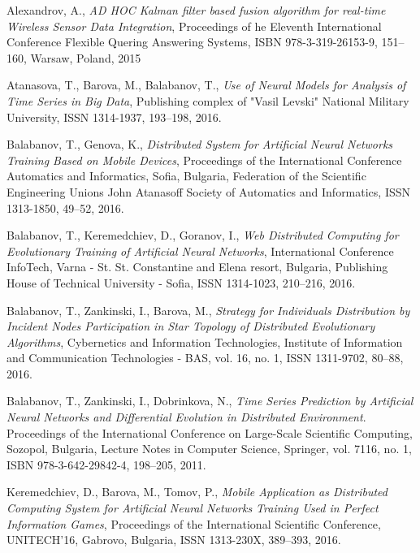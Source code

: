 \documentclass{llncs}
\begin{document}
\begin{thebibliography}{99}

 Alexandrov, A., \textit{AD HOC Kalman filter based fusion algorithm for real-time Wireless Sensor Data Integration}, Proceedings of he Eleventh International Conference Flexible Quering Answering Systems, ISBN 978-3-319-26153-9, 151--160, Warsaw, Poland, 2015

 Atanasova, T., Barova, M., Balabanov, T., \textit{Use of Neural Models for Analysis of Time Series in Big Data}, Publishing complex of "Vasil Levski" National Military University, ISSN 1314-1937, 193--198, 2016.

 Balabanov, T., Genova, K., \textit{Distributed System for Artificial Neural Networks Training Based on Mobile Devices}, Proceedings of the International Conference Automatics and Informatics, Sofia, Bulgaria, Federation of the Scientific Engineering Unions John Atanasoff Society of Automatics and Informatics, ISSN 1313-1850, 49--52, 2016.

 Balabanov, T., Keremedchiev, D., Goranov, I., \textit{Web Distributed Computing for Evolutionary Training of Artificial Neural Networks}, International Conference InfoTech, Varna - St. St. Constantine and Elena resort, Bulgaria, Publishing House of Technical University - Sofia, ISSN 1314-1023, 210--216, 2016.

 Balabanov, T., Zankinski, I., Barova, M., \textit{Strategy for Individuals Distribution by Incident Nodes Participation in Star Topology of Distributed Evolutionary Algorithms}, Cybernetics and Information Technologies, Institute of Information and Communication Technologies - BAS, vol. 16, no. 1, ISSN 1311-9702, 80--88, 2016.

 Balabanov, T., Zankinski, I., Dobrinkova, N., \textit{Time Series Prediction by Artificial Neural Networks and Differential Evolution in Distributed Environment}. Proceedings of the International Conference on Large-Scale Scientific Computing, Sozopol, Bulgaria, Lecture Notes in Computer Science, Springer, vol. 7116, no. 1, ISBN 978-3-642-29842-4, 198–205, 2011. 

 Keremedchiev, D., Barova, M., Tomov, P., \textit{Mobile Application as Distributed Computing System for Artificial Neural Networks Training Used in Perfect Information Games}, Proceedings of the International Scientific Conference, UNITECH’16, Gabrovo, Bulgaria, ISSN 1313-230X, 389--393, 2016.


\end{thebibliography}
\end{document}
